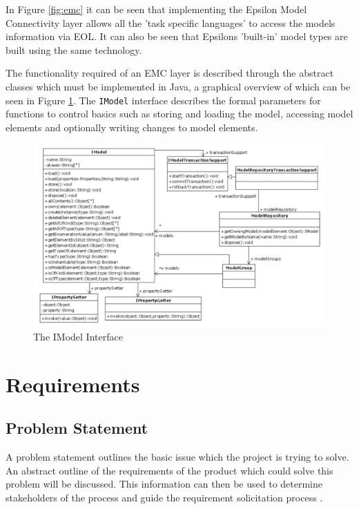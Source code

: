 \documentclass[11pt]{book}
\newcommand{\code}[1]{\texttt{#1}}
\begin{document}
In Figure \ref{fig:emc} it can be seen that implementing the Epsilon Model Connectivity layer allows all the 'task specific languages' to access the models information via EOL. It can also be seen that Epsilons 'built-in' model types are built using the same technology.

The functionality required of an EMC layer is described through the abstract classes which must be implemented in Java, a graphical overview of which can be seen in Figure \ref{fig:imodelinterface}. The \code{IModel} interface describes the formal parameters for functions to control basics such as storing and loading the model, accessing model elements and optionally writing changes to model elements.

\begin{figure}[H]
	\centering
	\includegraphics[width=\textwidth]{images/imodel-interface}
	\caption{The IModel Interface \cite{theepsilonbook}}
	\label{fig:imodelinterface}
\end{figure}


\chapter{Requirements}
\section{Problem Statement}
\label{problemstatement}
A problem statement outlines the basic issue which the project is trying to solve. An abstract outline of the requirements of the product which could solve this problem will be discussed. This information can then be used to determine stakeholders of the process and guide the requirement solicitation process \cite{problemstatement}.
\end{document}
